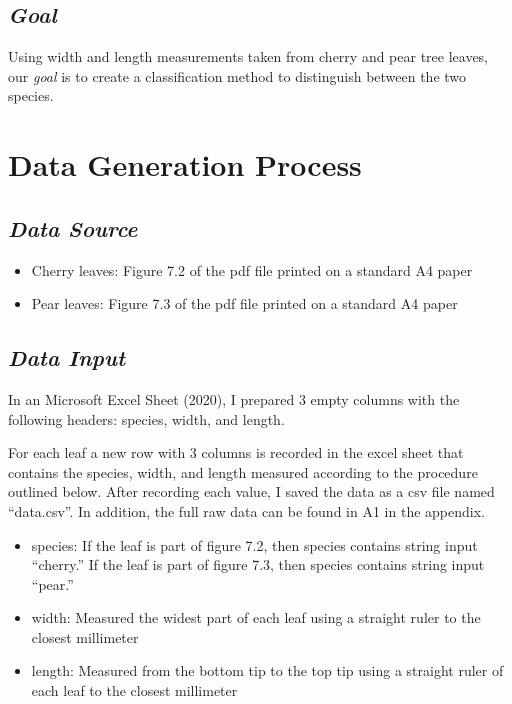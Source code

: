 \documentclass[]{article}
\providecommand{\tightlist}{%
  \setlength{\itemsep}{0pt}\setlength{\parskip}{0pt}}
\begin{document}
\subsection{\normalsize{\textit{Goal}}}

Using width and length measurements taken from cherry and pear tree
leaves, our \textit{goal} is to create a classification method to
distinguish between the two species.

\newpage

\section{Data Generation Process}

\subsection{\normalsize{\textit{Data Source}}}

\begin{itemize}
\tightlist
\item
  Cherry leaves: Figure 7.2 of the pdf file printed on a standard A4
  paper
\item
  Pear leaves: Figure 7.3 of the pdf file printed on a standard A4 paper
\end{itemize}

\subsection{\normalsize{\textit{Data Input}}}

In an Microsoft Excel Sheet (2020), I prepared 3 empty columns with the
following headers: species, width, and length.

For each leaf a new row with 3 columns is recorded in the excel sheet
that contains the species, width, and length measured according to the
procedure outlined below. After recording each value, I saved the data
as a csv file named ``data.csv''. In addition, the full raw data can be
found in A1 in the appendix.

\begin{itemize}
\tightlist
\item
  species: If the leaf is part of figure 7.2, then species contains
  string input ``cherry.'' If the leaf is part of figure 7.3, then
  species contains string input ``pear.''
\item
  width: Measured the widest part of each leaf using a straight ruler to
  the closest millimeter
\item
  length: Measured from the bottom tip to the top tip using a straight
  ruler of each leaf to the closest millimeter
\end{itemize}
\end{document}

